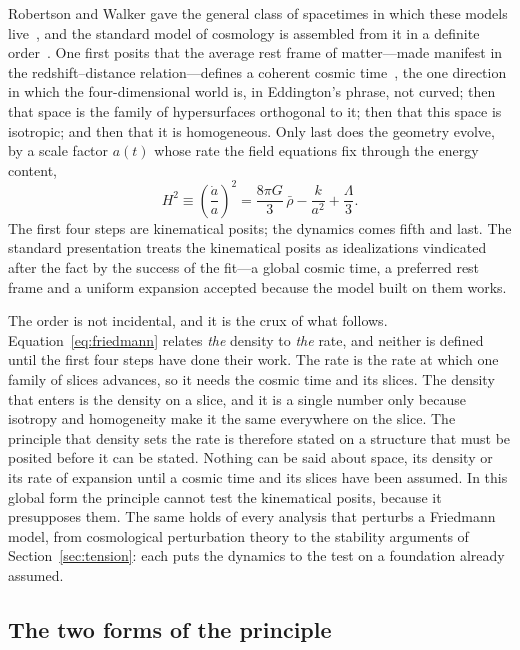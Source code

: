 \documentclass[twocolumn]{aastex701}
\begin{document}
Robertson and Walker gave the general class of spacetimes in which these models live~\citep{Robertson1929, Robertson1933, Robertson1935, Walker1937}, and the standard model of cosmology is assembled from it in a definite order~\citep{north1965}. One first posits that the average rest frame of matter---made manifest in the redshift--distance relation---defines a coherent cosmic time~\citep{Weyl1923}, the one direction in which the four-dimensional world is, in Eddington's phrase, not curved; then that space is the family of hypersurfaces orthogonal to it; then that this space is isotropic; and then that it is homogeneous. Only last does the geometry evolve, by a scale factor $a(t)$ whose rate the field equations fix through the energy content,
\begin{equation}
H^{2}\equiv\left(\frac{\dot a}{a}\right)^{2} = \frac{8\pi G}{3}\,\bar\rho - \frac{k}{a^{2}} + \frac{\Lambda}{3}.
\label{eq:friedmann}
\end{equation}
The first four steps are kinematical posits; the dynamics comes fifth and last. The standard presentation treats the kinematical posits as idealizations vindicated after the fact by the success of the fit---a global cosmic time, a preferred rest frame and a uniform expansion accepted because the model built on them works.

The order is not incidental, and it is the crux of what follows. Equation~\eqref{eq:friedmann} relates \emph{the} density to \emph{the} rate, and neither is defined until the first four steps have done their work. The rate is the rate at which one family of slices advances, so it needs the cosmic time and its slices. The density that enters is the density on a slice, and it is a single number only because isotropy and homogeneity make it the same everywhere on the slice. The principle that density sets the rate is therefore stated on a structure that must be posited before it can be stated. Nothing can be said about space, its density or its rate of expansion until a cosmic time and its slices have been assumed. In this global form the principle cannot test the kinematical posits, because it presupposes them. The same holds of every analysis that perturbs a Friedmann model, from cosmological perturbation theory to the stability arguments of Section~\ref{sec:tension}: each puts the dynamics to the test on a foundation already assumed.

\subsection{The two forms of the principle}\label{sec:twoforms}
\end{document}
